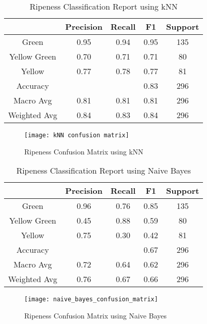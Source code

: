 \begin{table}[htbp]
	\centering
	\begin{tabular}{c|c|c|c|c}
	  \hline
	  \textbf{ } & \textbf{Precision} & \textbf{Recall} & \textbf{F1} & \textbf{Support} \\
	  \hline
	  Green & 0.95 & 0.94 & 0.95 & 135 \\
	  \hline
	  Yellow Green & 0.70 & 0.71 & 0.71 & 80 \\
	  \hline
	  Yellow & 0.77 & 0.78 & 0.77 & 81 \\
	  \hline
	  Accuracy &  &  & 0.83 & 296 \\
	  \hline
	  Macro Avg & 0.81 & 0.81 & 0.81 & 296 \\
	  \hline
	  Weighted Avg & 0.84 & 0.83 & 0.84 & 296 \\
	  \hline
	\end{tabular}
	\caption{Ripeness Classification Report using kNN}
	\label{tab:bruises_classification_report_knn}
\end{table}

\begin{figure}[!htbp]
	\centering
	\texttt{[image: kNN confusion matrix]}
	\caption{Ripeness Confusion Matrix using kNN}
	\label{fig:ripeness_confusion_matrix_knn_fig}
\end{figure}

\begin{table}[htbp]
	\centering
	\begin{tabular}{c|c|c|c|c}
		\hline
		\textbf{ } & \textbf{Precision} & \textbf{Recall} & \textbf{F1} & \textbf{Support} \\
		\hline
		Green & 0.96 & 0.76 & 0.85 & 135 \\
		\hline
		Yellow Green & 0.45 & 0.88 & 0.59 & 80 \\
		\hline
		Yellow & 0.75 & 0.30 & 0.42 & 81 \\
		\hline
		Accuracy &  &  & 0.67 & 296 \\
		\hline
		Macro Avg & 0.72 & 0.64 & 0.62 & 296 \\
		\hline
		Weighted Avg & 0.76 & 0.67 & 0.66 & 296 \\
		\hline
	\end{tabular}
	\caption{Ripeness Classification Report using Naive Bayes}
	\label{tab:bruises_classification_report_naive_bayes}
\end{table}

\begin{figure}[!htbp]
	\centering
	\texttt{[image: naive\_bayes\_confusion\_matrix]}
	\caption{Ripeness Confusion Matrix using Naive Bayes}
	\label{fig:ripeness_confusion_matrix_nv_fig}
\end{figure}

